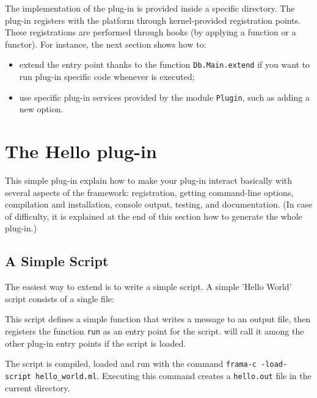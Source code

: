 The implementation of the plug-in is provided inside a specific directory.
The plug-in registers with the \framac platform through
kernel-provided registration points. These
registrations are performed  through hooks (by applying
a function or a functor). For instance,
the next section shows how to:
\begin{itemize}
\item extend the \framac entry point thanks to the function
  \texttt{Db.Main.extend} if you want to run
  plug-in specific code whenever \framac is executed;
\item use specific plug-in services provided by the module
  \texttt{Plugin}, such as adding a new \framac option.
\end{itemize}

\section{The Hello plug-in}\label{tut2:hello}

This simple plug-in explain how to make your plug-in interact basically
with several aspects of the \framac framework: registration, getting
command-line options, compilation and installation, console output,
testing, and documentation. (In case of difficulty, it is explained at
the end of this section how to generate the whole plug-in.)

\subsection{A Simple Script}\label{tut2:script}

The easiest way to extend \framac is to write a simple script. A
simple 'Hello World' script consists of a single \ocaml file:


This script defines a simple function that writes a message to an
output file, then registers the function \texttt{run} as an entry point for the
script. \framac will call it among the other plug-in entry points if the script
is loaded.

The script is compiled, loaded and run with the command
\texttt{frama-c -load-script hello\_world.ml}. Executing this command
creates a \texttt{hello.out} file in the current directory.

